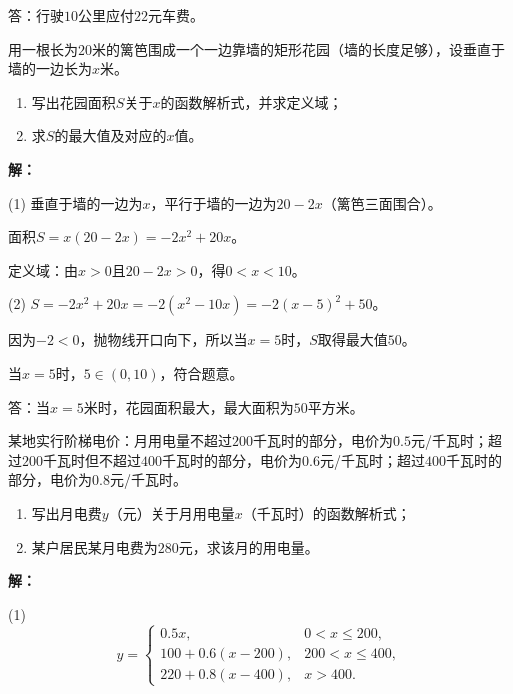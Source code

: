 \documentclass[12pt, a4paper]{ctexart}
\begin{document}
答：行驶$10$公里应付$22$元车费。

\vspace{6pt}

\begin{appbox}[【应用2】矩形面积问题]
用一根长为$20$米的篱笆围成一个一边靠墙的矩形花园（墙的长度足够），设垂直于墙的一边长为$x$米。
\begin{enumerate}[leftmargin=2em]
  \item 写出花园面积$S$关于$x$的函数解析式，并求定义域；
  \item 求$S$的最大值及对应的$x$值。
\end{enumerate}
\end{appbox}

\textbf{解：}

(1) 垂直于墙的一边为$x$，平行于墙的一边为$20-2x$（篱笆三面围合）。

面积$S=x(20-2x)=-2x^2+20x$。

定义域：由$x>0$且$20-2x>0$，得$0<x<10$。

(2) $S=-2x^2+20x=-2(x^2-10x)=-2(x-5)^2+50$。

因为$-2<0$，抛物线开口向下，所以当$x=5$时，$S$取得最大值$50$。

当$x=5$时，$5\in(0,10)$，符合题意。

答：当$x=5$米时，花园面积最大，最大面积为$50$平方米。

\vspace{6pt}

\begin{appbox}[【应用3】阶梯电价问题]
某地实行阶梯电价：月用电量不超过$200$千瓦时的部分，电价为$0.5$元/千瓦时；超过$200$千瓦时但不超过$400$千瓦时的部分，电价为$0.6$元/千瓦时；超过$400$千瓦时的部分，电价为$0.8$元/千瓦时。

\begin{enumerate}[leftmargin=2em]
  \item 写出月电费$y$（元）关于月用电量$x$（千瓦时）的函数解析式；
  \item 某户居民某月电费为$280$元，求该月的用电量。
\end{enumerate}
\end{appbox}

\textbf{解：}

(1)
\[
y =
\begin{cases}
0.5x,                      & 0<x\leq 200, \\
100+0.6(x-200),            & 200<x\leq 400, \\
220+0.8(x-400),            & x>400.
\end{cases}
\]
\end{document}
